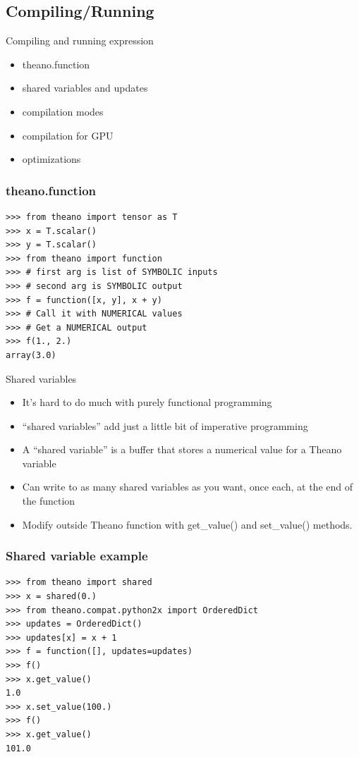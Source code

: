 \documentclass[utf8x,xcolor=pdftex,dvipsnames,table]{beamer}
\begin{document}
\subsection{Compiling/Running}
\begin{frame}{Compiling and running expression}
  \begin{itemize}
  \item theano.function
  \item shared variables and updates
  \item compilation modes
  \item compilation for GPU
  \item optimizations
  \end{itemize}
\end{frame}

\begin{frame}[fragile]
  \frametitle{theano.function}

\begin{lstlisting}
>>> from theano import tensor as T
>>> x = T.scalar()
>>> y = T.scalar()
>>> from theano import function
>>> # first arg is list of SYMBOLIC inputs
>>> # second arg is SYMBOLIC output
>>> f = function([x, y], x + y)
>>> # Call it with NUMERICAL values
>>> # Get a NUMERICAL output
>>> f(1., 2.)
array(3.0)
\end{lstlisting}
\end{frame}

\begin{frame}{Shared variables}
  \begin{itemize}
  \item It’s hard to do much with purely functional programming
  \item ``shared variables'' add just a little bit of imperative programming
  \item A “shared variable” is a buffer that stores a numerical value for a Theano variable
  \item Can write to as many shared variables as you want, once each, at the end of the function
  \item  Modify outside Theano function with get\_value() and set\_value() methods.
  \end{itemize}
\end{frame}

\begin{frame}[fragile]
  \frametitle{Shared variable example}

\begin{lstlisting}
>>> from theano import shared
>>> x = shared(0.)
>>> from theano.compat.python2x import OrderedDict
>>> updates = OrderedDict()
>>> updates[x] = x + 1
>>> f = function([], updates=updates)
>>> f()
>>> x.get_value()
1.0
>>> x.set_value(100.)
>>> f()
>>> x.get_value()
101.0
\end{lstlisting}
\end{frame}
\end{document}
